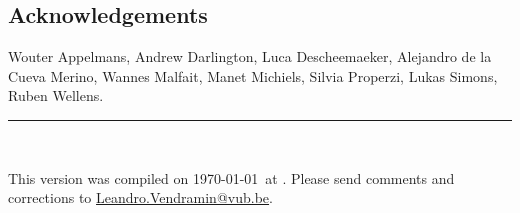 \subsection*{Acknowledgements}

Wouter Appelmans, Andrew Darlington, Luca Descheemaeker, 
Alejandro de la Cueva Merino, 
Wannes Malfait, Manet Michiels, Silvia Properzi, 
Lukas Simons, Ruben Wellens. 

\vfill
\noindent\rule{\textwidth}{0.4pt}\\[2pt]
{\footnotesize\indent This version was compiled on \today\ at \currenttime.
Please send comments and corrections to
\href{mailto:Leandro.Vendramin@vub.be}{Leandro.Vendramin@vub.be}.\par}



